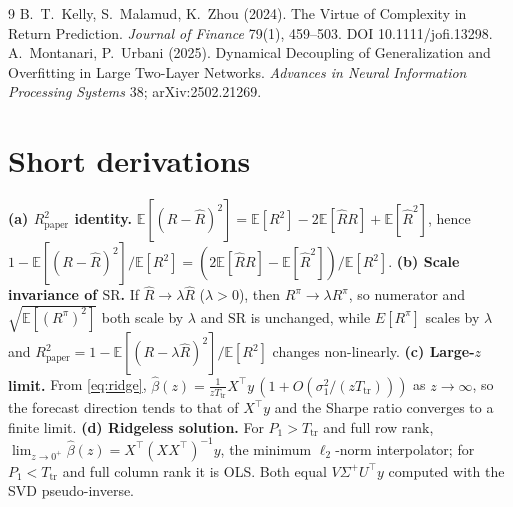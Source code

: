 \documentclass[11pt,a4paper]{article}
\newcommand{\E}{\mathbb{E}}
\newcommand{\bh}{\widehat{\beta}}
\newcommand{\Rpaper}{R^2_{\mathrm{paper}}}
\newcommand{\SR}{\mathrm{SR}}
\newcommand{\Ttr}{T_{\mathrm{tr}}}
\begin{document}
\begin{thebibliography}{9}\small
{} B.~T.~Kelly, S.~Malamud, K.~Zhou (2024). The Virtue of Complexity in Return Prediction. \emph{Journal of Finance} 79(1), 459--503. DOI 10.1111/jofi.13298.
 A.~Montanari, P.~Urbani (2025). Dynamical Decoupling of Generalization and Overfitting in Large Two-Layer Networks. \emph{Advances in Neural Information Processing Systems} 38; arXiv:2502.21269.
\end{thebibliography}

\appendix
\section{Short derivations}\label{app:proofs}
\textbf{(a) $\Rpaper$ identity.} $\E[(R-\widehat R)^2]=\E[R^2]-2\E[\widehat R R]+\E[\widehat R^2]$, hence $1-\E[(R-\widehat R)^2]/\E[R^2]=(2\E[\widehat RR]-\E[\widehat R^2])/\E[R^2]$.
\textbf{(b) Scale invariance of $\SR$.} If $\widehat R\to\lambda\widehat R$ ($\lambda>0$), then $R^\pi\to\lambda R^\pi$, so numerator and $\sqrt{\E[(R^\pi)^2]}$ both scale by $\lambda$ and $\SR$ is unchanged, while $E[R^\pi]$ scales by $\lambda$ and $\Rpaper=1-\E[(R-\lambda\widehat R)^2]/\E[R^2]$ changes non-linearly.
\textbf{(c) Large-$z$ limit.} From \eqref{eq:ridge}, $\bh(z)=\frac1{z\Ttr}X^\top y\,(1+O(\sigma_1^2/(z\Ttr)))$ as $z\to\infty$, so the forecast direction tends to that of $X^\top y$ and the Sharpe ratio converges to a finite limit.
\textbf{(d) Ridgeless solution.} For $P_1>\Ttr$ and full row rank, $\lim_{z\to0^+}\bh(z)=X^\top(XX^\top)^{-1}y$, the minimum $\ell_2$-norm interpolator; for $P_1<\Ttr$ and full column rank it is OLS. Both equal $V\Sigma^{+}U^\top y$ computed with the SVD pseudo-inverse.
\end{document}

